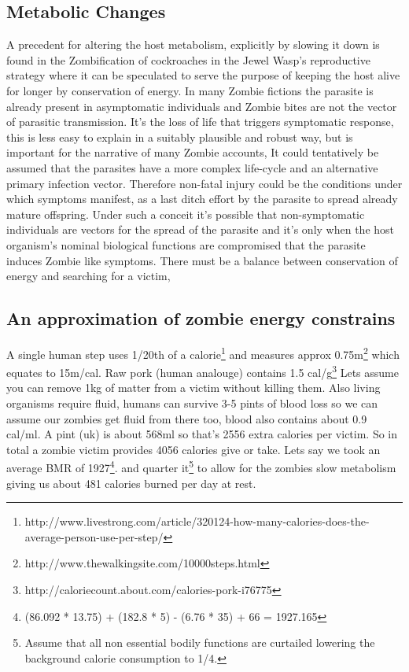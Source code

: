 \subsection{Metabolic Changes}
A precedent for altering the host metabolism, explicitly by slowing it down is found in the Zombification of cockroaches in the Jewel Wasp's reproductive strategy where it can be speculated to serve the purpose of keeping the host alive for longer by conservation of energy.
In many Zombie fictions the parasite is already present in asymptomatic individuals and Zombie bites are not the vector of parasitic transmission. It's the loss of life that triggers symptomatic response, this is less easy to explain in a suitably plausible and robust way, but is important for the narrative of many Zombie accounts, It could tentatively be assumed that the parasites have a more complex life-cycle and an alternative primary infection vector. Therefore non-fatal injury could be the conditions under which symptoms manifest, as a last ditch effort by the parasite to spread already mature offspring.
Under such a conceit it's possible that non-symptomatic individuals are vectors for the spread of the parasite and it's only when the host organism's nominal biological functions are compromised that the parasite induces Zombie like symptoms.
There must be a balance between conservation of energy and searching for a victim,
\subsection{An approximation of zombie energy constrains}
A single human step uses 1/20th of a calorie\footnote{http://www.livestrong.com/article/320124-how-many-calories-does-the-average-person-use-per-step/} and measures approx 0.75m\footnote{http://www.thewalkingsite.com/10000steps.html} 
which equates to 15m/cal. Raw pork (human analouge) contains 1.5 cal/g\footnote{http://caloriecount.about.com/calories-pork-i76775}
Lets assume you can remove 1kg of matter from a victim without killing them.
Also living organisms require fluid, humans can survive 3-5 pints of blood loss so we can assume our zombies get fluid from there too, blood also contains about 0.9 cal/ml.
A pint (uk) is about 568ml so that's 2556 extra calories per victim.
So in total a zombie victim provides 4056 calories give or take.
Lets say we took an average BMR of 1927\footnote{(86.092 * 13.75) + (182.8 * 5) - (6.76 * 35) + 66 = 1927.165}. and quarter it\footnote{Assume that all non essential bodily functions are curtailed lowering the background calorie consumption to 1/4.} to allow for the zombies slow metabolism giving us  
about 481 calories burned per day at rest.
\endinput
